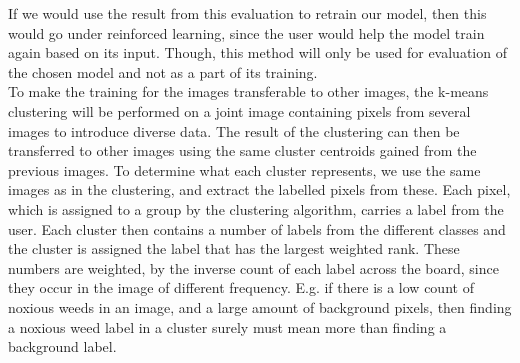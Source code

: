 If we would use the result from this evaluation to retrain our model, then this would go under reinforced learning, since the user would help the model train again based on its input. Though, this method will only be used for evaluation of the chosen model and not as a part of its training.\\

To make the training for the images transferable to other images, the k-means clustering will be performed on a joint image containing pixels from several images to introduce diverse data. The result of the clustering can then be transferred to other images using the same cluster centroids gained from the previous images. To determine what each cluster represents, we use the same images as in the clustering, and extract the labelled pixels from these. Each pixel, which is assigned to a group by the clustering algorithm, carries a label from the user. Each cluster then contains a number of labels from the different classes and the cluster is assigned the label that has the largest weighted rank. These numbers are weighted, by the inverse count of each label across the board, since they occur in the image of different frequency. E.g. if there is a low count of noxious weeds in an image, and a large amount of background pixels, then finding a noxious weed label in a cluster surely must mean more than finding a background label.\\
